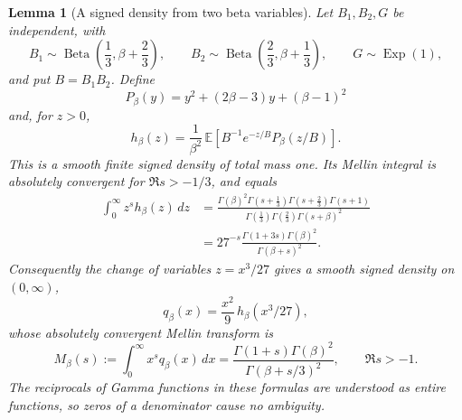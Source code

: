 \documentclass[11pt,a4paper]{article}
\numberwithin{equation}{section}
\newtheorem{lemma}[theorem]{Lemma}
\theoremstyle{definition}\newtheorem{definition}[theorem]{Definition}
\theoremstyle{remark}\newtheorem{remark}[theorem]{Remark}
\begin{document}
\begin{lemma}[A signed density from two beta variables]
\label{mix:signed-density}
Let \(B_1,B_2,G\) be independent, with
\[
 B_1\sim\operatorname{Beta}\!\left(\frac13,\beta+\frac23\right),
 \qquad
 B_2\sim\operatorname{Beta}\!\left(\frac23,\beta+\frac13\right),
 \qquad G\sim\operatorname{Exp}(1),
\]
and put \(B=B_1B_2\).  Define
\[
 P_\beta(y)=y^2+(2\beta-3)y+(\beta-1)^2
\]
and, for \(z>0\),
\begin{equation}\label{mix:Z-density}
 h_\beta(z)=\frac1{\beta^2}\,
   \mathbb E\!\left[B^{-1}e^{-z/B}P_\beta(z/B)\right].
\end{equation}
This is a smooth finite signed density of total mass one.  Its Mellin
integral is absolutely convergent for \(\Re s>-1/3\), and equals
\begin{align}
 \int_0^\infty z^s h_\beta(z)\,dz
 &=\frac{\Gamma(\beta)^2
       \Gamma(s+\frac13)\Gamma(s+\frac23)\Gamma(s+1)}
       {\Gamma(\frac13)\Gamma(\frac23)\Gamma(s+\beta)^2}
 \label{mix:Z-mellin}\\
 &=27^{-s}\frac{\Gamma(1+3s)\Gamma(\beta)^2}
                          {\Gamma(\beta+s)^2}.
 \nonumber
\end{align}
Consequently the change of variables \(z=x^3/27\) gives a smooth
signed density on \((0,\infty)\),
\begin{equation}\label{mix:X-density}
 q_\beta(x)=\frac{x^2}{9}\,h_\beta(x^3/27),
\end{equation}
whose absolutely convergent Mellin transform is
\begin{equation}\label{mix:X-mellin}
 M_\beta(s):=\int_0^\infty x^s q_\beta(x)\,dx
       =\frac{\Gamma(1+s)\Gamma(\beta)^2}
                    {\Gamma(\beta+s/3)^2},
       \qquad \Re s>-1.
\end{equation}
The reciprocals of Gamma functions in these formulas are understood
as entire functions, so zeros of a denominator cause no ambiguity.
\end{lemma}
\end{document}
